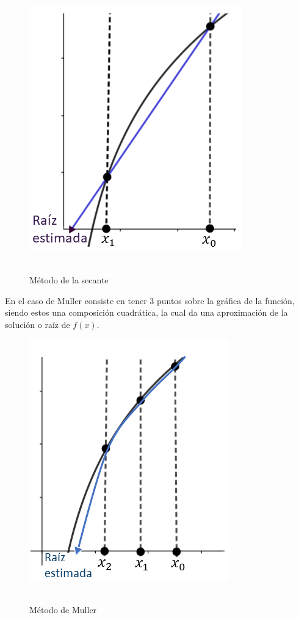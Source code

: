 \documentclass[fleqn,10pt]{SelfArx}
\begin{document}
\begin{figure}[ht]\centering
	\includegraphics[scale=0.5]{GrafSecante.png}\\\ 
	\caption{Método de la secante}
	\label{fig:secante}
\end{figure}
En el caso de 
Muller consiste en tener 3 puntos sobre la gráfica de la función, 
siendo estos una composición cuadrática, la cual da una aproximación de la solución o raíz de $f(x)$.
\begin{figure}[ht]\centering
	\includegraphics[scale=0.5]{GrafMuller.png}\\\
	
	\caption{Método de Muller}
	\label{fig:muller}
\end{figure}
\end{document}
